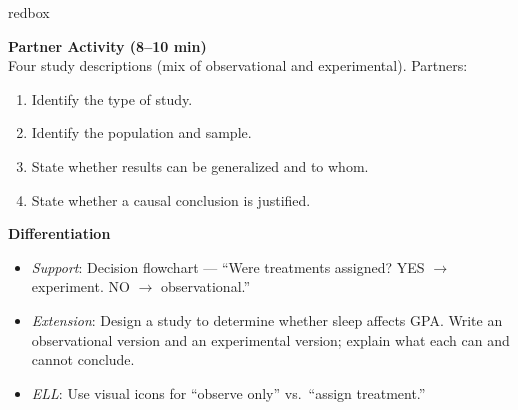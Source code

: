 \documentclass[10pt]{article}
\begin{document}
\begin{skillbox}{redbox}
\begin{minipage}[t]{0.48\linewidth}
    \textbf{Partner Activity (8--10 min)}\\
    Four study descriptions (mix of observational and experimental). Partners:
    \begin{enumerate}
        \item Identify the type of study.
        \item Identify the population and sample.
        \item State whether results can be generalized and to whom.
        \item State whether a causal conclusion is justified.
    \end{enumerate}
\end{minipage}
\hfill
\begin{minipage}[t]{0.48\linewidth}
    \textbf{Differentiation}
    \begin{itemize}
        \item \textit{Support}: Decision flowchart --- ``Were treatments assigned?
              YES $\to$ experiment. NO $\to$ observational.''
        \item \textit{Extension}: Design a study to determine whether sleep affects
              GPA. Write an observational version and an experimental version; explain
              what each can and cannot conclude.
        \item \textit{ELL}: Use visual icons for ``observe only'' vs.\ ``assign
              treatment.''
    \end{itemize}
\end{minipage}
\end{skillbox}
\end{document}
